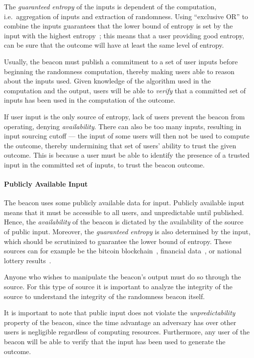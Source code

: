 The \emph{guaranteed entropy} of the inputs is dependent of the computation, i.e.\ aggregation of inputs and extraction of randomness.
Using \enquote{exclusive OR} to combine the inputs guarantees that the lower bound of entropy is set by the input with the highest entropy~\cite{lenstra2015random};
this means that a user providing good entropy, can be sure that the outcome will have at least the same level of entropy.

Usually, the beacon must publish a commitment to a set of user inputs before beginning the randomness computation,  thereby making users able to reason about the inputs used.
Given knowledge of the algorithm used in the computation and the output, users will be able to \emph{verify} that a committed set of inputs has been used in the computation of the outcome.

If user input is the only source of entropy, lack of users prevent the beacon from operating, denying \emph{availability}.
There can also be too many inputs, resulting in input sourcing cutoff ---
the input of some users will then not be used to compute the outcome, thereby undermining that set of users' ability to trust the given outcome.
This is because a user must be able to identify the presence of a trusted input in the committed set of inputs, to trust the beacon outcome.

\paragraph{Publicly Available Input}
The beacon uses some publicly available data for input.
Publicly available input means that it must be accessible to all users, and unpredictable until published.
Hence, the \emph{availability} of the beacon is dictated by the availability of the source of public input.
Moreover, the \emph{guaranteed entropy} is also determined by the input, which should be scrutinized to guarantee the lower bound of entropy.
These sources can for example be the bitcoin blockchain~\cite{bonneau2015bitcoin, bentov2016bitcoin}, financial data~\cite{clark2010use}, or national lottery results~\cite{baigneres2015trap}.

Anyone who wishes to manipulate the beacon's output must do so through the source.
For this type of source it is important to analyze the integrity of the source to understand the integrity of the randomness beacon itself.

It is important to note that public input does not violate the \emph{unpredictability} property of the beacon, since the time advantage an adversary has over other users is negligible regardless of computing resources.
Furthermore, any user of the beacon will be able to verify that the input has been used to generate the outcome.

